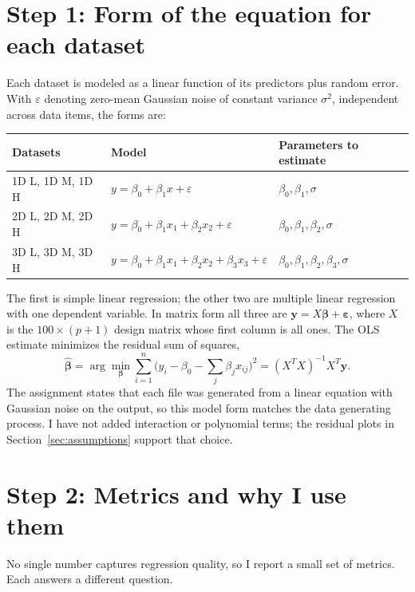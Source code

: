 \documentclass[11pt]{article}
\begin{document}
\section{Step 1: Form of the equation for each dataset}

Each dataset is modeled as a linear function of its predictors plus random error. With $\varepsilon$ denoting zero-mean Gaussian noise of constant variance $\sigma^2$, independent across data items, the forms are:

\begin{center}
\begin{tabular}{lll}
\toprule
Datasets & Model & Parameters to estimate\\
\midrule
1D L, 1D M, 1D H & $y = \beta_0 + \beta_1 x + \varepsilon$ & $\beta_0, \beta_1, \sigma$\\
2D L, 2D M, 2D H & $y = \beta_0 + \beta_1 x_1 + \beta_2 x_2 + \varepsilon$ & $\beta_0, \beta_1, \beta_2, \sigma$\\
3D L, 3D M, 3D H & $y = \beta_0 + \beta_1 x_1 + \beta_2 x_2 + \beta_3 x_3 + \varepsilon$ & $\beta_0, \beta_1, \beta_2, \beta_3, \sigma$\\
\bottomrule
\end{tabular}
\end{center}

The first is simple linear regression; the other two are multiple linear regression with one dependent variable. In matrix form all three are $\mathbf{y} = X\boldsymbol\beta + \boldsymbol\varepsilon$, where $X$ is the $100 \times (p+1)$ design matrix whose first column is all ones. The OLS estimate minimizes the residual sum of squares,
\[
\hat{\boldsymbol\beta} = \arg\min_{\boldsymbol\beta} \sum_{i=1}^{n} \big(y_i - \beta_0 - \textstyle\sum_j \beta_j x_{ij}\big)^2 = (X^TX)^{-1}X^T\mathbf{y}.
\]
The assignment states that each file was generated from a linear equation with Gaussian noise on the output, so this model form matches the data generating process. I have not added interaction or polynomial terms; the residual plots in Section~\ref{sec:assumptions} support that choice.

\section{Step 2: Metrics and why I use them}

No single number captures regression quality, so I report a small set of metrics. Each answers a different question.
\end{document}
